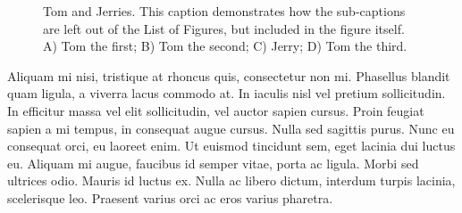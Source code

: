 \begin{figure}[htbp]
{       \qquad
      }
    \caption[Tom and Jerry]{Tom and Jerries. This caption demonstrates how the sub-captions are left out of the List of Figures, but included in the figure itself. A) Tom the first; B) Tom the second; C) Jerry; D) Tom the third.}
    \label{mice}
  \end{figure}


Aliquam mi nisi, tristique at rhoncus quis, consectetur non mi. Phasellus blandit quam ligula, a viverra lacus commodo at. In iaculis nisl vel pretium sollicitudin. In efficitur massa vel elit sollicitudin, vel auctor sapien cursus. Proin feugiat sapien a mi tempus, in consequat augue cursus. Nulla sed sagittis purus. Nunc eu consequat orci, eu laoreet enim. Ut euismod tincidunt sem, eget lacinia dui luctus eu. Aliquam mi augue, faucibus id semper vitae, porta ac ligula. Morbi sed ultrices odio. Mauris id luctus ex. Nulla ac libero dictum, interdum turpis lacinia, scelerisque leo. Praesent varius orci ac eros varius pharetra.




